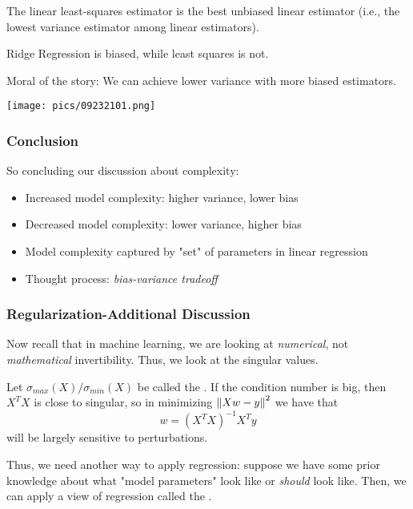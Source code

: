 \documentclass[11pt]{scrartcl}
\begin{document}
\begin{thm}
The linear least-squares estimator is the best unbiased linear estimator (i.e., the lowest variance estimator among linear estimators).
\end{thm}

\begin{ex}
Ridge Regression is biased, while least squares is not.
\end{ex}

Moral of the story: We can achieve lower variance with more biased estimators.  
\begin{center}
    \texttt{[image: pics/09232101.png]}
\end{center}

\subsubsection{Conclusion}
So concluding our discussion about complexity:
\begin{itemize}
    \item Increased model complexity: higher variance, lower bias
    \item Decreased model complexity: lower variance, higher bias
    \item Model complexity captured by "set" of parameters in linear regression
    \item Thought process: \textit{bias-variance tradeoff}
\end{itemize}

\subsubsection{Regularization-Additional Discussion}

Now recall that in machine learning, we are looking at \textit{numerical}, not \textit{mathematical} invertibility. Thus, we look at the singular values.

Let $\sigma_{max}(X)/\sigma_{min}(X)$ be called the . If the condition number is big, then $X^{T}X$ is close to singular, so in minimizing $\left\lVert Xw-y\right\rVert^2$ we have that $$w=(X^{T}X)^{-1}X^{T}y$$ will be largely sensitive to perturbations. 

Thus, we need another way to apply regression: suppose we have some prior knowledge about what "model parameters" look like or \textit{should} look like. Then, we can apply a view of regression called the . 
\end{document}
